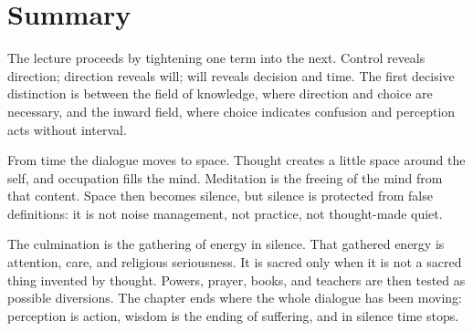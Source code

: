 \section{Summary}

The lecture proceeds by tightening one term into the next. Control reveals direction; direction reveals will; will reveals decision and time. The first decisive distinction is between the field of knowledge, where direction and choice are necessary, and the inward field, where choice indicates confusion and perception acts without interval.

From time the dialogue moves to space. Thought creates a little space around the self, and occupation fills the mind. Meditation is the freeing of the mind from that content. Space then becomes silence, but silence is protected from false definitions: it is not noise management, not practice, not thought-made quiet.

The culmination is the gathering of energy in silence. That gathered energy is attention, care, and religious seriousness. It is sacred only when it is not a sacred thing invented by thought. Powers, prayer, books, and teachers are then tested as possible diversions. The chapter ends where the whole dialogue has been moving: perception is action, wisdom is the ending of suffering, and in silence time stops.